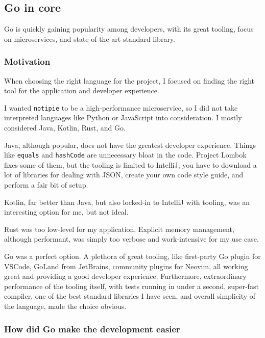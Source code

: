 \subsection{Go in core}\label{sec:go-in-core}

Go is quickly gaining popularity among developers,
with its great tooling, focus on microservices,
and state-of-the-art standard library.

\subsubsection{Motivation}\label{sec:motivation}

When choosing the right language for the project,
I focused on finding the right tool
for the application and developer experience.

I wanted \texttt{notipie} to be a high-performance microservice,
so I did not take interpreted languages
like Python or JavaScript into consideration.
I mostly considered Java, Kotlin, Rust, and Go.

Java, although popular, does not have the greatest developer experience.
Things like \texttt{equals} and \texttt{hashCode}
are unnecessary bloat in the code.
Project Lombok~\cite{zwitserloot_project_2022} fixes some of them,
but the tooling is limited to IntelliJ,
you have to download a lot of libraries for dealing with JSON,
create your own code style guide,
and perform a fair bit of setup.

Kotlin, far better than Java,
but also locked-in to IntelliJ with tooling,
was an interesting option for me, but not ideal.

Rust was too low-level for my application.
Explicit memory management, although performant,
was simply too verbose and work-intensive for my use case.

Go was a perfect option.
A plethora of great tooling,
like first-party Go plugin for VSCode, GoLand from JetBrains,
community plugins for Neovim,
all working great and providing a good developer experience.
Furthermore, extraordinary performance of the tooling itself,
with tests running in under a second, super-fast compiler,
one of the best standard libraries I have seen,
and overall simplicity of the language, made the choice obvious.

\subsubsection{How did Go make the development easier}\label{sec:how-did-go-make-the-development-easier}

